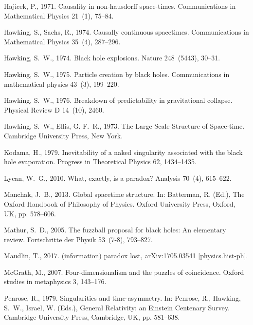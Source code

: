 \documentclass[authoryear,12pt,3p]{jowarticle}
\begin{document}
\begin{thebibliography}{32}
Hajicek, P., 1971. Causality in non-hausdorff space-times. Communications in
  Mathematical Physics 21~(1), 75--84.

Hawking, S., Sachs, R., 1974. Causally continuous spacetimes. Communications in
  Mathematical Physics 35~(4), 287--296.

Hawking, S.~W., 1974. Black hole explosions. Nature 248~(5443), 30--31.

Hawking, S.~W., 1975. Particle creation by black holes. Communications in
  mathematical physics 43~(3), 199--220.

Hawking, S.~W., 1976. Breakdown of predictability in gravitational collapse.
  Physical Review D 14~(10), 2460.

Hawking, S.~W., Ellis, G. F.~R., 1973. The Large Scale Structure of Space-time.
  Cambridge University Press, New York.

Kodama, H., 1979. Inevitability of a naked singularity associated with the
  black hole evaporation. Progress in Theoretical Physics 62, 1434--1435.

Lycan, W.~G., 2010. What, exactly, is a paradox? Analysis 70~(4), 615--622.

Manchak, J.~B., 2013. Global spacetime structure. In: Batterman, R. (Ed.), The
  Oxford Handbook of Philosophy of Physics. Oxford University Press, Oxford,
  UK, pp. 578--606.

Mathur, S.~D., 2005. The fuzzball proposal for black holes: An elementary
  review. Fortschritte der Physik 53~(7-8), 793--827.

Maudlin, T., 2017. (information) paradox lost, arXiv:1705.03541
  [physics.hist-ph].

McGrath, M., 2007. Four-dimensionalism and the puzzles of coincidence. Oxford
  studies in metaphysics 3, 143--176.

Penrose, R., 1979. Singularities and time-asymmetry. In: Penrose, R., Hawking,
  S.~W., Israel, W. (Eds.), General Relativity: an Einstein Centenary Survey.
  Cambridge University Press, Cambridge, UK, pp. 581--638.


\end{thebibliography}
\end{document}
